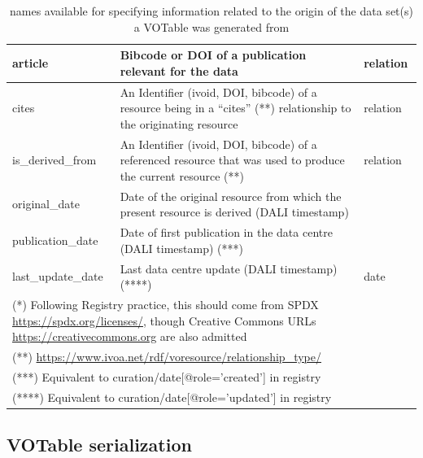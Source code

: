 \documentclass[11pt,a4paper]{ivoa}
\begin{document}
\begin{table}[!h]
{\begin{tabular}{|l|>{\raggedright}p{7cm}|l|}
article            & Bibcode or DOI of a publication relevant for the data & relation\\ \hline
cites              & An Identifier (ivoid, DOI, bibcode) of a resource
                     being in a ``cites'' (**) relationship to the
                     originating resource & relation\\ \hline
is\_derived\_from  & An Identifier (ivoid, DOI, bibcode) of a referenced resource
					 that was used to produce the current resource (**) & relation\\ \hline
%
original\_date     & Date of the original resource from which the present resource is derived (DALI timestamp) &  \\ \hline
publication\_date  & Date of first publication in the data centre  (DALI timestamp) (***) &  \\ \hline
last\_update\_date & Last data centre update (DALI timestamp) (****)  & date\\ \hline
\multicolumn{3}{p{\textwidth}}{\vskip2pt\footnotesize(*) Following Registry
practice, this should come from
SPDX \url{https://spdx.org/licenses/}, though Creative Commons URLs
\url{https://creativecommons.org} are also admitted}\\
\multicolumn{3}{p{\textwidth}}{\footnotesize(**) \url{https://www.ivoa.net/rdf/voresource/relationship\_type/}}\\
\multicolumn{3}{p{\textwidth}}{\footnotesize(***) Equivalent to curation/date[@role='created'] in registry}\\
\multicolumn{3}{p{\textwidth}}{\footnotesize(****) Equivalent to curation/date[@role='updated'] in registry}
\end{tabular}\hss}
\caption{ names available for specifying information
related to the origin of the data set(s) a VOTable was generated from}
\label{tab:origin-names}
\end{table}


\subsection{VOTable serialization}
\end{document}
